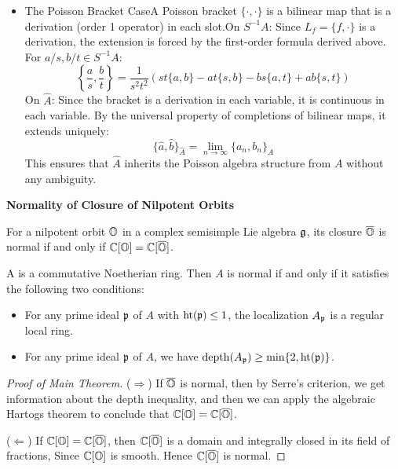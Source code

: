 {\begin{itemize}
    \item The Poisson Bracket CaseA Poisson bracket $\{ \cdot, \cdot \}$ is a bilinear map that is a derivation (order 1 operator) in each slot.On $S^{-1}A$: Since $L_f = \{f, \cdot\}$ is a derivation, the extension is forced by the first-order formula derived above. For $a/s, b/t \in S^{-1}A$:\[\left\{ \frac{a}{s}, \frac{b}{t} \right\} = \frac{1}{s^2 t^2} \left( st\{a, b\} - at\{s, b\} - bs\{a, t\} + ab\{s, t\} \right)\]On $\widehat{A}$: Since the bracket is a derivation in each variable, it is continuous in each variable. By the universal property of completions of bilinear maps, it extends uniquely:\[\{ \widehat{a}, \widehat{b} \}_{\widehat{A}} = \lim_{n \to \infty} \{ a_n, b_n \}_A\]This ensures that $\widehat{A}$ inherits the Poisson algebra structure from $A$ without any ambiguity.
  \end{itemize}
  }






\textbf{Normality of Closure of Nilpotent Orbits}

\begin{thm}
  For a nilpotent orbit $\mathbb{O}$ in a complex semisimple Lie algebra $\mathfrak{g}$, its closure $\overline{\mathbb{O}}$ is normal if and only if $\mathbb{C}[\mathbb{O}] = \mathbb{C}[\overline{\mathbb{O}}]$.
\end{thm}

\begin{lem}
  A is a commutative Noetherian ring. Then $A$ is normal if and only if it satisfies the following two conditions:
\begin{itemize}
  \item [($R_1$)] For any prime ideal $\mathfrak{p}$ of $A$ with $\mathrm{ht}(\mathfrak{p}) \leq 1$, the localization $A_{\mathfrak{p}}$ is a regular local ring.
  \item [($S_2$)] For any prime ideal $\mathfrak{p}$ of $A$, we have $\mathrm{depth}(A_{\mathfrak{p}}) \geq \min\{2, \mathrm{ht}(\mathfrak{p})\}$.
\end{itemize}
\end{lem}

\begin{proof}[Proof of Main Theorem]
  ($\Rightarrow$) If $\overline{\mathbb{O}}$ is normal, then by Serre's criterion, we get information about the depth inequality, and then we can apply the algebraic Hartogs theorem \cite[Chapter III, Exercise 3.5]{Har77} to conclude that $\mathbb{C}[\mathbb{O}] = \mathbb{C}[\overline{\mathbb{O}}]$.

  ($\Leftarrow$) If $\mathbb{C}[\mathbb{O}] = \mathbb{C}[\overline{\mathbb{O}}]$, then $\mathbb{C}[\overline{\mathbb{O}}]$ is a domain and integrally closed in its field of fractions, Since $\mathbb{C}[\mathbb{O}]$ is smooth. Hence $\mathbb{C}[\overline{\mathbb{O}}]$ is normal.
\end{proof}



